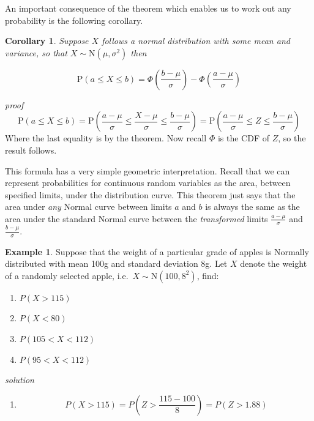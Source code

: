 \documentclass[
]{book}
\providecommand{\tightlist}{%
  \setlength{\itemsep}{0pt}\setlength{\parskip}{0pt}}
\newtheorem{corollary}{Corollary}[chapter]
\theoremstyle{definition}
\theoremstyle{definition}
\newtheorem{example}{Example}[chapter]
\theoremstyle{definition}
\theoremstyle{definition}
\theoremstyle{remark}
\begin{document}
An important consequence of the theorem which enables us to work out any probability is the following corollary.

\begin{corollary}
Suppose \(X\) follows a normal distribution with some mean and variance, so that \(X\sim \text{N}(\mu,\sigma^2)\) then

\[\text{P}(a\leq X \leq b) = \Phi\left(\frac{b-\mu}{\sigma}\right) - \Phi\left(\frac{a-\mu}{\sigma}\right)\]
\end{corollary}

\emph{proof}
\[\text{P}(a\leq X \leq b) = \text{P}\left(\frac{a-\mu}{\sigma} \leq \frac{X-\mu}{\sigma}  \leq  \frac{b-\mu}{\sigma}\right) = \text{P}\left(\frac{a-\mu}{\sigma} \leq Z  \leq  \frac{b-\mu}{\sigma}\right) \]
Where the last equality is by the theorem. Now recall \(\Phi\) is the CDF of \(Z\), so the result follows.

This formula has a very simple geometric interpretation. Recall that we can represent probabilities for continuous random variables as the area, between specified limits, under the distribution curve. This theorem just says that the area under \emph{any} Normal curve between limits \(a\) and \(b\) is always the same as the area under the standard Normal
curve between the \emph{transformed} limits \(\frac{a-\mu}{\sigma}\) and \(\frac{b-\mu}{\sigma}\).

\begin{example}

Suppose that the weight of a particular grade of apples is Normally distributed with mean 100g and standard deviation 8g. Let \(X\) denote the weight of a randomly selected apple, i.e.~\(X\sim\text{N}(100,{8^2})\), find:

\begin{enumerate}
\def\labelenumi{\arabic{enumi}.}
\item
  \(P(X>115)\)
\item
  \(P(X< 80)\)
\item
  \(P(105<X<112)\)
\item
  \(P(95<X<112)\)
\end{enumerate}

\end{example}

\emph{solution}

\begin{enumerate}
\def\labelenumi{\arabic{enumi}.}
\tightlist
\item
  \[P(X>115)  =  P\left(Z>\frac{115-100}{8}\right)
          =  P(Z>1.88)\]
\end{enumerate}
\end{document}
